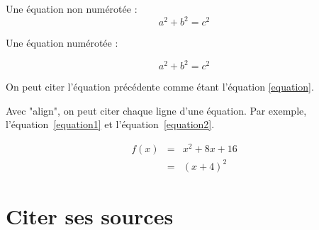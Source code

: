 \documentclass[12pt]{article}
\begin{document}
Une équation non numérotée :
$$a^2 + b^2 = c^2$$

Une équation numérotée :

\begin{equation}
a^2 + b^2 = c^2
\label{equation}
\end{equation}

On peut citer l'équation précédente comme étant l'équation \ref{equation}.

Avec "align", on peut citer chaque ligne d'une équation. Par exemple, l'équation~\ref{equation1} et l'équation~\ref{equation2}.

\begin{align}
   f(x) & = & x^2 + 8x + 16 \label{equation1}\\  
   & = & (x+4)^2 \label{equation2}
\end{align}


\section{Citer ses sources}
\end{document}
